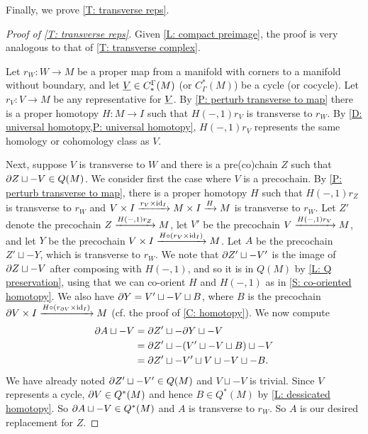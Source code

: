 Finally, we prove \cref{T: transverse reps}.

\begin{proof}[Proof of \cref{T: transverse reps}]
	Given \cref{L: compact preimage}, the proof is very analogous to that of \cref{T: transverse complex}.

	Let $r_W \colon W \to M$ be a proper map from a manifold with corners to a manifold without boundary, and let $\underline{V} \in C_*^\Gamma(M)$ (or $C^*_\Gamma(M)$) be a cycle (or cocycle).
	Let $r_V \colon V \to M$ be any representative for $\underline{V}$.
	By \cref{P: perturb transverse to map} there is a proper homotopy $H \colon M \to I$ such that $H(-,1)r_V$ is transverse to $r_W$.
	By \cref{D: universal homotopy,P: universal homotopy}, $H(-,1)r_V$ represents the same homology or cohomology class as $V$.

	Next, suppose $V$ is transverse to $W$ and there is a pre(co)chain $Z$ such that $\partial Z \sqcup -V \in Q(M)$.
	We consider first the case where $V$ is a precochain.
	By \cref{P: perturb transverse to map}, there is a proper homotopy $H$ such that $H(-,1)r_Z$ is transverse to $r_W$ and $V \times I \xrightarrow{r_V \times \mathrm{id}_I} M \times I \xrightarrow{H} M$ is transverse to $r_W$.
	Let $Z'$ denote the precochain $Z \xrightarrow{H(-,1)r_Z} M$, let $V'$ be the precochain $V \xrightarrow{H(-,1)r_V} M$, and let $Y$ be the precochain $V \times I \xrightarrow{H\circ (r_V \times \mathrm{id}_I)} M$.
	Let $A$ be the precochain $Z' \sqcup -Y$, which is transverse to $r_W$.
	We note that $\partial Z' \sqcup -V'$ is the image of $\partial Z \sqcup -V$ after composing with $H(-,1)$, and so it is in $Q(M)$ by \cref{L: Q preservation}, using that we can co-orient $H$ and $H(-,1)$ as in \cref{S: co-oriented homotopy}.
	We also have $\partial Y = V' \sqcup -V \sqcup B$, where $B$ is the precochain $\partial V \times I \xrightarrow{H\circ (r_{\partial V} \times \mathrm{id}_I)} M$ (cf. the proof of \cref{C: homotopy}).
	We now compute
	\begin{align*}
		\partial A \sqcup -V &= \partial Z' \sqcup -\partial Y \sqcup -V\\
		&= \partial Z' \sqcup -(V' \sqcup -V \sqcup B) \sqcup -V\\
		&= \partial Z' \sqcup -V' \sqcup V \sqcup -V \sqcup -B.
	\end{align*}
	We have already noted $\partial Z' \sqcup -V' \in Q(M)$ and $V \sqcup -V$ is trivial.
	Since $V$ represents a cycle, $\partial V \in Q^*(M)$ and hence $B \in Q^*(M)$ by \cref{L: dessicated homotopy}.
	So $\partial A \sqcup -V \in Q^*(M)$ and $A$ is transverse to $r_W$.
	So $A$ is our desired replacement for $Z$.


\end{proof}

